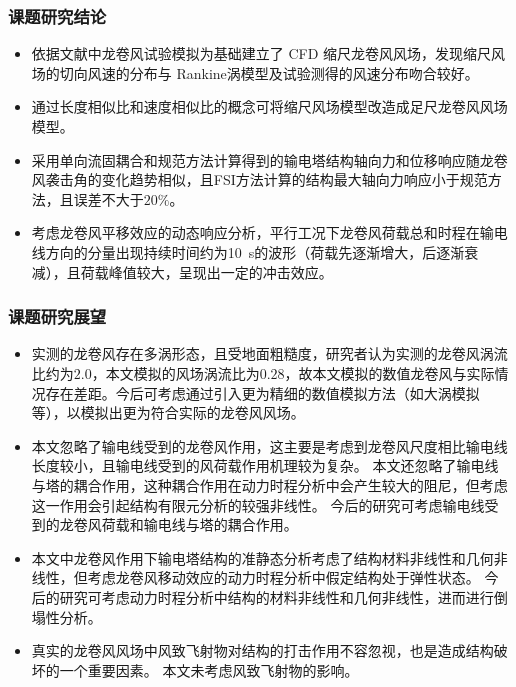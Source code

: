 \begin{frame}
  \frametitle{课题研究结论}
  \begin{itemize}
  \item
    依据文献中龙卷风试验模拟为基础建立了 CFD 缩尺龙卷风风场，发现缩尺风场的切向风速的分布与 Rankine涡模型及试验测得的风速分布吻合较好。
  \item
    通过长度相似比和速度相似比的概念可将缩尺风场模型改造成足尺龙卷风风场模型。
  \item
    采用单向流固耦合和规范方法计算得到的输电塔结构轴向力和位移响应随龙卷风袭击角的变化趋势相似，且FSI方法计算的结构最大轴向力响应小于规范方法，且误差不大于$20\%$。
  \item
    考虑龙卷风平移效应的动态响应分析，平行工况下龙卷风荷载总和时程在输电线方向的分量出现持续时间约为\SI{10}{s}的波形（荷载先逐渐增大，后逐渐衰减），且荷载峰值较大，呈现出一定的冲击效应。
  \end{itemize}
\end{frame}

\begin{frame}
  \frametitle{课题研究展望}
  \begin{itemize}
  \item
    实测的龙卷风存在多涡形态，且受地面粗糙度，研究者认为实测的龙卷风涡流比约为$2.0$，本文模拟的风场涡流比为$0.28$，故本文模拟的数值龙卷风与实际情况存在差距。今后可考虑通过引入更为精细的数值模拟方法（如大涡模拟等），以模拟出更为符合实际的龙卷风风场。

  \item
    本文忽略了输电线受到的龙卷风作用，这主要是考虑到龙卷风尺度相比输电线长度较小，且输电线受到的风荷载作用机理较为复杂。
    本文还忽略了输电线与塔的耦合作用，这种耦合作用在动力时程分析中会产生较大的阻尼，但考虑这一作用会引起结构有限元分析的较强非线性。
    今后的研究可考虑输电线受到的龙卷风荷载和输电线与塔的耦合作用。

  \item
    本文中龙卷风作用下输电塔结构的准静态分析考虑了结构材料非线性和几何非线性，但考虑龙卷风移动效应的动力时程分析中假定结构处于弹性状态。
    今后的研究可考虑动力时程分析中结构的材料非线性和几何非线性，进而进行倒塌性分析。

  \item
    真实的龙卷风风场中风致飞射物对结构的打击作用不容忽视，也是造成结构破坏的一个重要因素。
    本文未考虑风致飞射物的影响。
  \end{itemize}
\end{frame}



